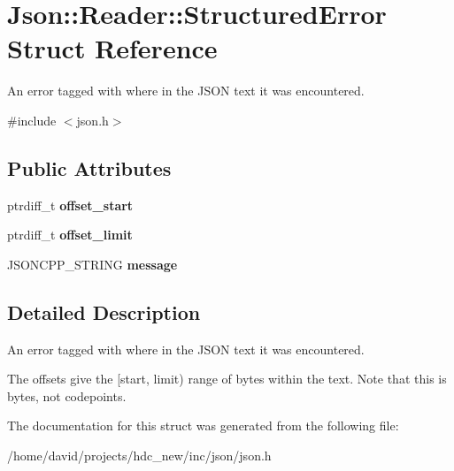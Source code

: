 \hypertarget{struct_json_1_1_reader_1_1_structured_error}{}\section{Json\+:\+:Reader\+:\+:Structured\+Error Struct Reference}
\label{struct_json_1_1_reader_1_1_structured_error}


An error tagged with where in the J\+S\+ON text it was encountered.  




{\ttfamily \#include $<$json.\+h$>$}

\subsection*{Public Attributes}
\begin{DoxyCompactItemize}
\item 
ptrdiff\+\_\+t {\bfseries offset\+\_\+start}\hypertarget{struct_json_1_1_reader_1_1_structured_error_ac98af0da2d704be4b64a9572a682423b}{}\label{struct_json_1_1_reader_1_1_structured_error_ac98af0da2d704be4b64a9572a682423b}

\item 
ptrdiff\+\_\+t {\bfseries offset\+\_\+limit}\hypertarget{struct_json_1_1_reader_1_1_structured_error_ad76ac01aeb0ada7e882c2df5daa54c6e}{}\label{struct_json_1_1_reader_1_1_structured_error_ad76ac01aeb0ada7e882c2df5daa54c6e}

\item 
J\+S\+O\+N\+C\+P\+P\+\_\+\+S\+T\+R\+I\+NG {\bfseries message}\hypertarget{struct_json_1_1_reader_1_1_structured_error_a2d2dc387aefe406a71de3daa263a38f4}{}\label{struct_json_1_1_reader_1_1_structured_error_a2d2dc387aefe406a71de3daa263a38f4}

\end{DoxyCompactItemize}


\subsection{Detailed Description}
An error tagged with where in the J\+S\+ON text it was encountered. 

The offsets give the \mbox{[}start, limit) range of bytes within the text. Note that this is bytes, not codepoints. 

The documentation for this struct was generated from the following file\+:\begin{DoxyCompactItemize}
\item 
/home/david/projects/hdc\+\_\+new/inc/json/json.\+h\end{DoxyCompactItemize}
